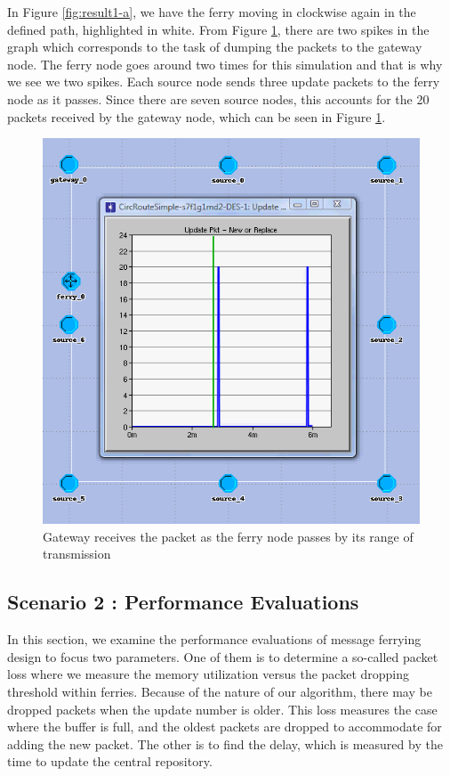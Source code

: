 In Figure \ref{fig:result1-a}, we have the ferry moving in clockwise again in the defined path, highlighted in white.  
From Figure \ref{fig:result1-b}, there are two spikes in the graph which corresponds to the task of dumping the packets to the gateway node.  
The ferry node goes around two times for this simulation and that is why we see we two spikes.  
Each source node sends three update packets to the ferry node as it passes.  
Since there are seven source nodes, this accounts for the 20 packets received by the gateway node, which can be seen in Figure \ref{fig:result1-b}.


\begin{figure}[h]
    \centering
    \includegraphics[width=.5\textwidth]{images/scenario1-result-gateway}
    \caption{Gateway receives the packet as the ferry node passes by its range of transmission}
    \label{fig:result1-b}
\end{figure}




\subsection{Scenario 2 : Performance Evaluations}
\label{sec:scenario2}


In this section, we examine the performance evaluations of message ferrying design to focus two parameters.  
One of them is to determine a so-called packet loss where we measure the memory utilization versus the packet dropping threshold within ferries.
Because of the nature of our algorithm, there may be dropped packets when the update number is older.
This loss measures the case where the buffer is full, and the oldest packets are dropped to accommodate for adding the new packet.  
The other is to find the delay, which is measured by the time to update the central repository.

